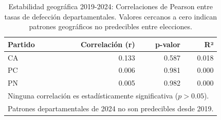 \begin{table}[H]
\centering
\caption{Estabilidad geográfica 2019-2024: Correlaciones de Pearson entre tasas de defección departamentales. Valores cercanos a cero indican patrones geográficos no predecibles entre elecciones.}
\label{tab:correlation_2019_2024}
\begin{tabular}{lrrr}
\toprule
\textbf{Partido} & \textbf{Correlación (r)} & \textbf{p-valor} & \textbf{R²} \\
\midrule
CA & 0.133 & 0.587 & 0.018 \\
PC & 0.006 & 0.981 & 0.000 \\
PN & 0.005 & 0.982 & 0.000 \\
\bottomrule
\multicolumn{4}{l}{\footnotesize Ninguna correlación es estadísticamente significativa ($p > 0.05$).} \\
\multicolumn{4}{l}{\footnotesize Patrones departamentales de 2024 no son predecibles desde 2019.} \\
\end{tabular}
\end{table}
